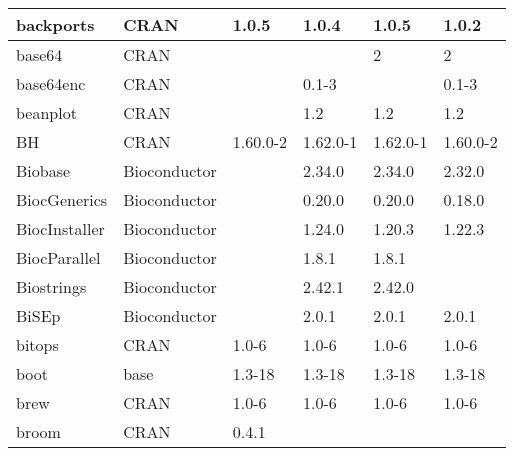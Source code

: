 \begin{longtable}{|llllll|}
backports                     & CRAN                      & 1.0.5       & 1.0.4       & 1.0.5          & 1.0.2            \\ \hline
base64                        & CRAN                      &             &             & 2              & 2                 \\ \hline \rowcolor{gray!25}
base64enc                     & CRAN                      &             & 0.1-3       &                & 0.1-3            \\ \hline
beanplot                      & CRAN                      &             & 1.2         & 1.2            & 1.2               \\ \hline \rowcolor{gray!25}
BH                            & CRAN                      & 1.60.0-2    & 1.62.0-1    & 1.62.0-1       & 1.60.0-2         \\ \hline
Biobase                       & Bioconductor              &             & 2.34.0      & 2.34.0         & 2.32.0            \\ \hline \rowcolor{gray!25}
BiocGenerics                  & Bioconductor              &             & 0.20.0      & 0.20.0         & 0.18.0           \\ \hline
BiocInstaller                 & Bioconductor              &             & 1.24.0      & 1.20.3         & 1.22.3            \\ \hline \rowcolor{gray!25}
BiocParallel                  & Bioconductor              &             & 1.8.1       & 1.8.1          &                  \\ \hline
Biostrings                    & Bioconductor              &             & 2.42.1      & 2.42.0         &                   \\ \hline \rowcolor{gray!25}
BiSEp                         & Bioconductor              &             & 2.0.1       & 2.0.1          & 2.0.1            \\ \hline
bitops                        & CRAN                      & 1.0-6       & 1.0-6       & 1.0-6          & 1.0-6             \\ \hline \rowcolor{gray!25}
boot                          & base                      & 1.3-18      & 1.3-18      & 1.3-18         & 1.3-18           \\ \hline
brew                          & CRAN                      & 1.0-6       & 1.0-6       & 1.0-6          & 1.0-6             \\ \hline \rowcolor{gray!25}
broom                         & CRAN                      & 0.4.1       &             &                &                  \\ \hline

\end{longtable}
